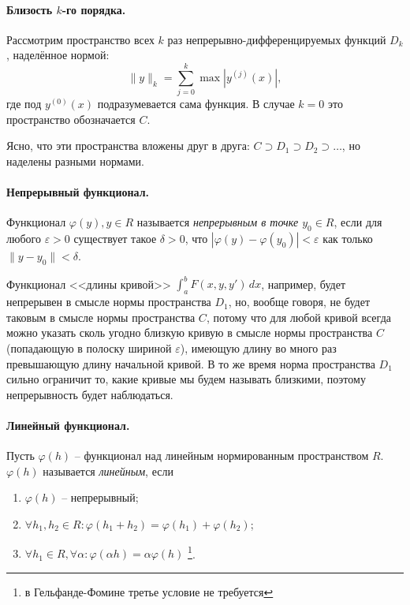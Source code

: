 
\paragraph{Близость $k$-го порядка.}
Рассмотрим пространство всех $k$ раз непрерывно-дифференцируемых функций $D_k$, наделённое
нормой:
\[
  \|y\|_k = \sum_{j=0}^{k} \max |y^{(j)} (x)|,
\]
где под $y^{(0)} (x)$ подразумевается сама функция. В случае $k = 0$ это пространство обозначается $C$.

Ясно, что эти пространства вложены друг в друга:
$C \supset D_1 \supset D_2 \supset \dots$, но наделены разными нормами.

\paragraph{Непрерывный функционал.}
\begin{definition}
  Функционал $\varphi(y), y \in R$ называется \emph{непрерывным в точке
  $y_0 \in R$}, если для любого $\varepsilon > 0$ существует такое $\delta > 0$,
  что $|\varphi(y) - \varphi(y_0)| < \varepsilon$ как только $\|y - y_0\| < \delta$.
\end{definition}

Функционал <<длины кривой>> $\int_a^b F(x, y, y') \, dx$, например, будет непрерывен в смысле 
нормы пространства $D_1$, но, вообще говоря, не будет таковым в смысле нормы пространства $C$,
потому что для любой кривой всегда можно указать сколь угодно близкую кривую в смысле нормы
пространства $C$ (попадающую в полоску шириной $\varepsilon$), имеющую длину во много раз
превышающую длину начальной кривой. В то же время норма пространства $D_1$ сильно ограничит
то, какие кривые мы будем называть близкими, поэтому непрерывность будет наблюдаться.

\paragraph{Линейный функционал.}
\begin{definition}
  Пусть $\varphi(h)$ -- функционал над линейным нормированным пространством $R$.
  $\varphi(h)$ называется \emph{линейным}, если 
  \begin{enumerate}
    \item $\varphi(h)$ -- непрерывный;
    \item $\forall h_1, h_2 \in R : \varphi(h_1 + h_2) = \varphi(h_1) + \varphi(h_2)$;
    \item $\forall h_1 \in R, \forall \alpha : \varphi(\alpha h) = \alpha \varphi(h)$
      \footnote{в Гельфанде-Фомине третье условие не требуется}.
  \end{enumerate}
\end{definition}


